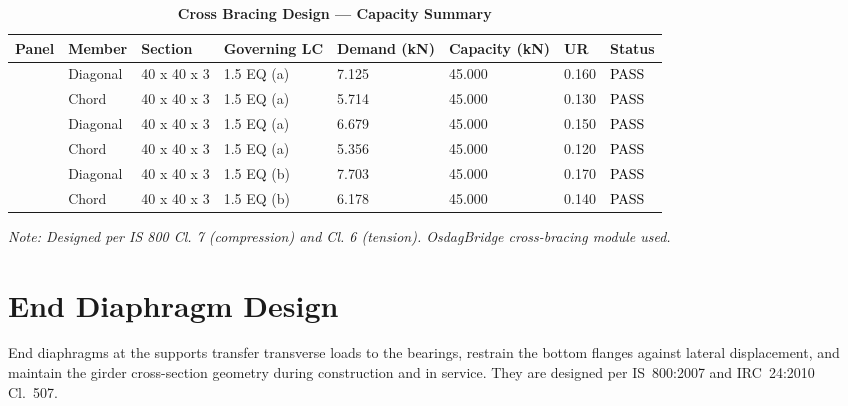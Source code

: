 \documentclass[12pt,a4paper]{report}
\numberwithin{table}{chapter}
\numberwithin{figure}{chapter}
\begin{document}
\vspace{1em}
\begin{longtable}{|C{2.0cm}|L{1.8cm}|C{2.2cm}|C{3.0cm}|C{1.8cm}|C{1.8cm}|C{1.2cm}|C{1.8cm}|}
\caption{\textbf{Cross Bracing Design --- Capacity Summary}}
\hline
\textbf{Panel} & \textbf{Member} & \textbf{Section} & \textbf{Governing LC} & \textbf{Demand (kN)} & \textbf{Capacity (kN)} & \textbf{UR} & \textbf{Status} \\[6pt]
\hline
{} & Diagonal & 40 x 40 x 3 & 1.5 EQ (a) & 7.125 & 45.000 & 0.160 & \textcolor{black}{PASS} \\[6pt]
 & Chord & 40 x 40 x 3 & 1.5 EQ (a) & 5.714 & 45.000 & 0.130 & \textcolor{black}{PASS} \\[6pt]
\hline
{} & Diagonal & 40 x 40 x 3 & 1.5 EQ (a) & 6.679 & 45.000 & 0.150 & \textcolor{black}{PASS} \\[6pt]
 & Chord & 40 x 40 x 3 & 1.5 EQ (a) & 5.356 & 45.000 & 0.120 & \textcolor{black}{PASS} \\[6pt]
\hline
{} & Diagonal & 40 x 40 x 3 & 1.5 EQ (b) & 7.703 & 45.000 & 0.170 & \textcolor{black}{PASS} \\[6pt]
 & Chord & 40 x 40 x 3 & 1.5 EQ (b) & 6.178 & 45.000 & 0.140 & \textcolor{black}{PASS} \\[6pt]
\hline
\end{longtable}
\noindent\textit{Note: Designed per IS 800 Cl. 7 (compression) and Cl. 6 (tension). OsdagBridge cross-bracing module used.}

\section{End Diaphragm Design}
\label{sec:end-diaphragm}

End diaphragms at the supports transfer transverse loads to the bearings, restrain the bottom flanges against lateral displacement, and maintain the girder cross-section geometry during construction and in service. They are designed per IS~800:2007 and IRC~24:2010 Cl.~507.

\vspace{1em}

\vspace{0.4em}
\noindent
\setlength{\tabcolsep}{4pt}
\setlength{\LTleft}{0pt}
\setlength{\LTright}{\fill}
\end{document}
